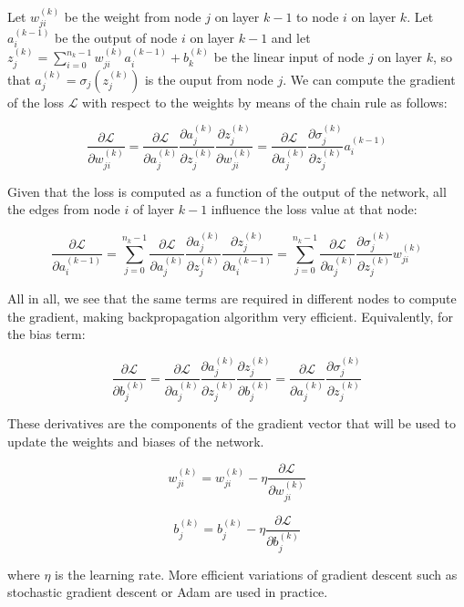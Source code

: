 Let $w_{ji}^{(k)}$ be the weight from node $j$ on layer $k-1$ to node $i$ on layer $k$. Let $a_i^{(k-1)}$ be the output of node $i$ on layer $k-1$ and let $z_j^{(k)} = \sum_{i=0}^{n_k - 1} w_{ji}^{(k)} a_i^{(k-1)} + b_k^{(k)}$ be 
the linear input of node $j$ on layer $k$, so that $a_j^{(k)} = \sigma_j(z_j^{(k)})$ is the ouput from node $j$. We can compute the gradient of the loss $\mathcal{L}$ with respect to the weights by means of the chain rule as follows: 

$$  
\frac{\partial \mathcal{L}}{\partial w_{ji}^{(k)}} = \frac{\partial \mathcal{L}}{\partial a_{j}^{(k)}} \frac{\partial a_{j}^{(k)}}{\partial z_{j}^{(k)}} \frac {\partial z_{j}^{(k)}} {\partial w_{ji}^{(k)}} =
\frac{\partial \mathcal{L}}{\partial a_{j}^{(k)}} \frac{\partial \sigma_j^{(k)}}{\partial z_{j}^{(k)}} a_i^{(k-1)}
$$

Given that the loss is computed as a function of the output of the network, all the edges from node $i$ of layer $k-1$ influence the loss value at that node:

$$
\frac{\partial \mathcal{L}}{\partial a_{i}^{(k-1)}} = \sum_{j=0}^{n_{k} - 1} \frac{\partial \mathcal{L}}{\partial a_{j}^{(k)}}  \frac{\partial a_{j}^{(k)}}{\partial z_{j}^{(k)}} \frac{\partial z_{j}^{(k)}}{\partial a_{i}^{(k-1)}} =
\sum_{j=0}^{n_{k} - 1} \frac{\partial \mathcal{L}}{\partial a_{j}^{(k)}} \frac{\partial \sigma_j^{(k)}}{\partial z_{j}^{(k)}} w_{ji}^{(k)}
$$

All in all, we see that the same terms are required in different nodes to compute the gradient, making backpropagation algorithm very efficient. Equivalently, for the bias term:

$$
\frac{\partial \mathcal{L}}{\partial b_{j}^{(k)}} = \frac{\partial \mathcal{L}}{\partial a_{j}^{(k)}} \frac{\partial a_{j}^{(k)}}{\partial z_{j}^{(k)}} \frac {\partial z_{j}^{(k)}} {\partial b_{j}^{(k)}} = \frac{\partial \mathcal{L}}{\partial a_{j}^{(k)}} \frac{\partial \sigma_j^{(k)}}{\partial z_{j}^{(k)}}
$$

These derivatives are the components of the gradient vector that will be used to update the weights and biases of the network.

$$
w_{ji}^{(k)} = w_{ji}^{(k)} -\eta \frac{\partial \mathcal{L}}{\partial w_{ji}^{(k)}}
$$

$$
b_{j}^{(k)} = b_{j}^{(k)} -\eta \frac{\partial \mathcal{L}}{\partial b_{j}^{(k)}}
$$

where $\eta$ is the learning rate. More efficient variations of gradient descent such as stochastic gradient descent or Adam are used in practice.


